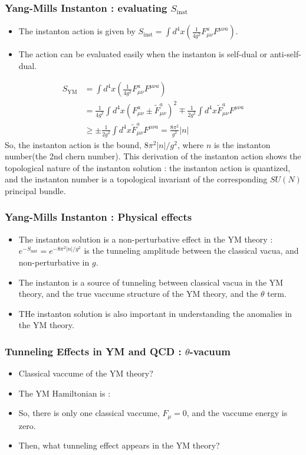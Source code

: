 \documentclass[10pt]{beamer}
\begin{document}
\begin{frame}
        \frametitle{Yang-Mills Instanton : evaluating $S_{\text{inst}}$}
        \begin{itemize}
        \item The instanton action is given by $S_{\text{inst}} = \int d^4x \left(\frac{1}{4g^2}F_{\mu\nu}^a F^{\mu\nu a}\right)$.
        \item The action can be evaluated easily when the instanton is self-dual or anti-self-dual.
        \end{itemize}
        \begin{align*}
        S_{\text{YM}} &= \int d^4x \left(\frac{1}{4g^2}F_{\mu\nu}^a F^{\mu\nu a}\right) \\
        &=  \frac{1}{4g^2} \int d^4x \left(F_{\mu\nu}^a \pm \tilde{F}_{\mu\nu}^a\right)^2 \mp \frac{1}{2g^2} \int d^4x \tilde{F}_{\mu\nu}^a F^{\mu\nu a} \\ 
        &\geq \pm \frac{1}{2g^2} \int d^4x \tilde{F}_{\mu\nu}^a F^{\mu\nu a} = \frac{8\pi^2}{g^2}|n|
        \end{align*}
        So, the instanton action is the bound, $8\pi^2|n|/g^2$, where $n$ is the instanton number(the 2nd chern number).
        This derivation of the instanton action shows the topological nature of the instanton solution : the instanton action is quantized, and the instanton number is a topological invariant of the corresponding $SU(N)$ principal bundle.
        \end{frame}

\begin{frame}
\frametitle{Yang-Mills Instanton : Physical effects}
\begin{itemize}
\item The instanton solution is a non-perturbative effect in the YM theory : $e^{-S_{\text{inst}}}=e^{-8\pi^2|n|/g^2}$ is the tunneling amplitude between the classical vacua, and non-perturbative in $g$.
\item The instanton is a source of tunneling between classical vacua in the YM theory, and the true vaccume structure of the YM theory, and the $\theta$ term.
\item THe instanton solution is also important in understanding the anomalies in the YM theory.
\end{itemize}
\end{frame}
\begin{frame}
    \frametitle{Tunneling Effects in YM and QCD : $\theta$-vacuum}
    \begin{itemize}
    \item Classical vaccume of the YM theory?
    \item The YM Hamiltonian is : 
    \item So, there is only one classical vaccume, $F_\mu = 0$, and the vaccume energy is zero.
    \item Then, what tunneling effect appears in the YM theory?
    \end{itemize}
    \end{frame}
\end{document}
